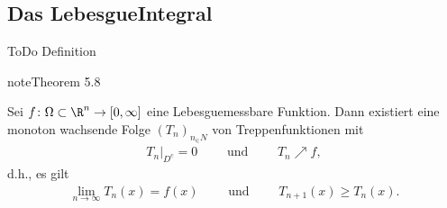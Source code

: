 \documentclass[letterpaper,10pt,english]{jupyterBook}
\begin{document}
\subsection{Das Lebesgue\sphinxhyphen{}Integral}
\label{\detokenize{masstheorie/lebesgue_integral:das-lebesgue-integral}}
\sphinxAtStartPar
ToDo Definition
\label{masstheorie/lebesgue_integral:theorem-4}
\begin{sphinxadmonition}{note}{Theorem 5.8}



\sphinxAtStartPar
Sei \(f \colon \Omega \subset \R^n \rightarrow [0,\infty]\) eine Lebesgue\sphinxhyphen{}messbare Funktion.
Dann existiert eine monoton wachsende Folge \((T_n)_{n_\in N}\) von Treppenfunktionen mit
\begin{equation*}
\begin{split}T_n|_{D^c} = 0 \qquad \text{ und } \qquad T_n \nearrow f,\end{split}
\end{equation*}
\sphinxAtStartPar
d.h., es gilt
\begin{equation*}
\begin{split}\lim_{n\rightarrow \infty} T_n(x) = f(x) \qquad \text{ und } \qquad T_{n+1}(x) \geq T_n(x).\end{split}
\end{equation*}\end{sphinxadmonition}
\end{document}
